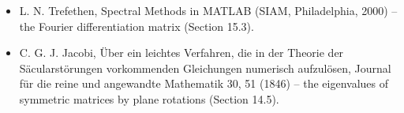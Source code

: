 \documentclass[
  10pt,
]{article}
\begin{document}
\begin{itemize}
  gap in superconductors, Soviet Physics JETP 38, 1018 (1974); R. A.
  Barankov, L. S. Levitov and B. Z. Spivak, Collective Rabi oscillations
  and solitons in a time-dependent BCS pairing problem, Physical Review
  Letters 93, 160401 (2004) -- the collisionless dynamics of a
  condensate (Section 15.1).
\item
  L. N. Trefethen, Spectral Methods in MATLAB (SIAM, Philadelphia, 2000)
  -- the Fourier differentiation matrix (Section 15.3).
\item
  C. G. J. Jacobi, Über ein leichtes Verfahren, die in der Theorie der
  Säcularstörungen vorkommenden Gleichungen numerisch aufzulösen,
  Journal für die reine und angewandte Mathematik 30, 51 (1846) -- the
  eigenvalues of symmetric matrices by plane rotations (Section 14.5).
\end{itemize}
\end{document}
